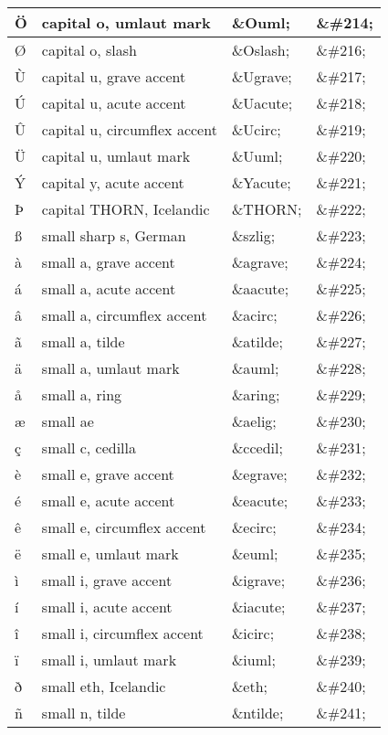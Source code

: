 \begin{longtable}{|p{60pt}|p{120pt}|p{60pt}|p{60pt}|}
\hline
Ö	&capital o, umlaut mark			&\&Ouml;	&\&\#214;\\
\hline
Ø	&capital o, slash				&\&Oslash;	&\&\#216;\\
\hline
Ù	&capital u, grave accent			&\&Ugrave;	&\&\#217;\\
\hline
Ú	&capital u, acute accent			&\&Uacute;	&\&\#218;\\
\hline
Û	&capital u, circumflex accent		&\&Ucirc;	&\&\#219;\\
\hline
Ü	&capital u, umlaut mark			&\&Uuml;	&\&\#220;\\
\hline
Ý	&capital y, acute accent			&\&Yacute;	&\&\#221;\\
\hline
Þ	&capital THORN, Icelandic		&\&THORN;	&\&\#222;\\
\hline
ß	&small sharp s, German			&\&szlig;		&\&\#223;\\
\hline
à	&small a, grave accent			&\&agrave;	&\&\#224;\\
\hline
á	&small a, acute accent			&\&aacute;	&\&\#225;\\
\hline
â	&small a, circumflex accent		&\&acirc;		&\&\#226;\\
\hline
ã	&small a, tilde					&\&atilde;	&\&\#227;\\
\hline
ä	&small a, umlaut mark			&\&auml;		&\&\#228;\\
\hline
å	&small a, ring					&\&aring;		&\&\#229;\\
\hline
æ	&small ae					&\&aelig;		&\&\#230;\\
\hline
ç	&small c, cedilla				&\&ccedil;	&\&\#231;\\
\hline
è	&small e, grave accent			&\&egrave;	&\&\#232;\\
\hline
é	&small e, acute accent			&\&eacute;	&\&\#233;\\
\hline
ê	&small e, circumflex accent		&\&ecirc;		&\&\#234;\\
\hline
ë	&small e, umlaut mark			&\&euml;		&\&\#235;\\
\hline
ì	&small i, grave accent			&\&igrave;	&\&\#236;\\
\hline
í	&small i, acute accent			&\&iacute;	&\&\#237;\\
\hline
î	&small i, circumflex accent		&\&icirc;		&\&\#238;\\
\hline
ï	&small i, umlaut mark			&\&iuml;		&\&\#239;\\
\hline
ð	&small eth, Icelandic			&\&eth;		&\&\#240;\\
\hline
ñ	&small n, tilde				&\&ntilde;	&\&\#241;\\
\hline

\end{longtable}
